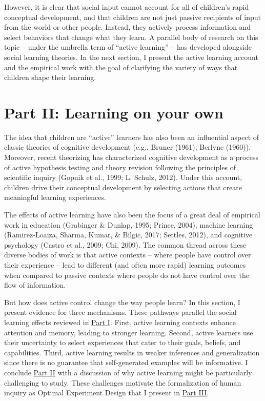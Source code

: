 \documentclass[english,floatsintext,man]{apa6}
\theoremstyle{definition}
\theoremstyle{definition}
\theoremstyle{definition}
\theoremstyle{remark}
\begin{document}
However, it is clear that social input cannot account for all of
children's rapid conceptual development, and that children are not just
passive recipients of input from the world or other people. Instead,
they actively process information and select behaviors that change what
they learn. A parallel body of research on this topic -- under the
umbrella term of \enquote{active learning} -- has developed alongside
social learning theories. In the next section, I present the active
learning account and the empirical work with the goal of clarifying the
variety of ways that children shape their learning.

\hypertarget{p2}{\section{Part II: Learning on your own}\label{p2}}

The idea that children are \enquote{active} learners has also been an
influential aspect of classic theories of cognitive development (e.g.,
Bruner (1961); Berlyne (1960)). Moreover, recent theorizing has
characterized cognitive development as a process of active hypothesis
testing and theory revision following the principles of scientific
inquiry (Gopnik et al., 1999; L. Schulz, 2012). Under this account,
children drive their conceptual development by selecting actions that
create meaningful learning experiences.

The effects of active learning have also been the focus of a great deal
of empirical work in education (Grabinger \& Dunlap, 1995; Prince,
2004), machine learning (Ramirez-Loaiza, Sharma, Kumar, \& Bilgic, 2017;
Settles, 2012), and cognitive psychology (Castro et al., 2009; Chi,
2009). The common thread across these diverse bodies of work is that
active contexts -- where people have control over their experience --
lead to different (and often more rapid) learning outcomes when compared
to passive contexts where people do not have control over the flow of
information.

But how does active control change the way people learn? In this
section, I present evidence for three mechanisms. These pathways
parallel the social learning effects reviewed in
\protect\hyperlink{p1}{Part I}. First, active learning contexts enhance
attention and memory, leading to stronger learning. Second, active
learners use their uncertainty to select experiences that cater to their
goals, beliefs, and capabilities. Third, active learning results in
weaker inferences and generalization since there is no guarantee that
self-generated examples will be informative. I conclude
\protect\hyperlink{p2}{Part II} with a discussion of why active learning
might be particularly challenging to study. These challenges motivate
the formalization of human inquiry as Optimal Experiment Design that I
present in \protect\hyperlink{p3}{Part III}.
\end{document}
